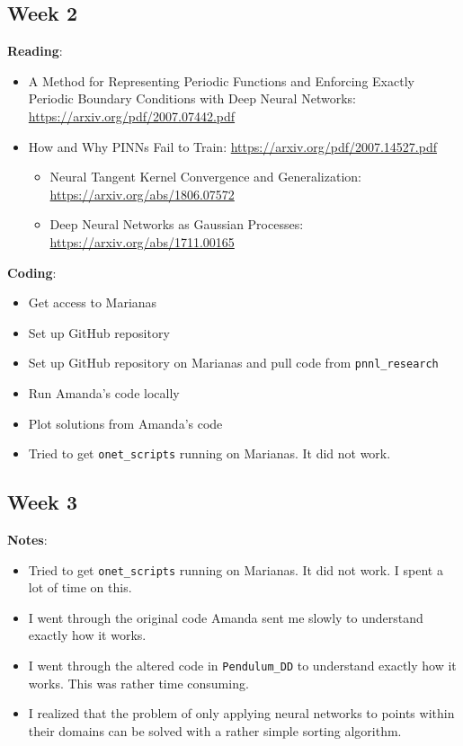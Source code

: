 \documentclass{article}
\def\bf{\textbf}
\begin{document}
\subsection*{Week 2}
\bf{Reading}:
\begin{itemize}
	\item A Method for Representing Periodic Functions and Enforcing Exactly Periodic Boundary Conditions with Deep Neural Networks: \url{https://arxiv.org/pdf/2007.07442.pdf}
	\item How and Why PINNs Fail to Train: \url{https://arxiv.org/pdf/2007.14527.pdf}
	\begin{itemize}
		\item Neural Tangent Kernel Convergence and Generalization: \url{https://arxiv.org/abs/1806.07572}
		\item Deep Neural Networks as Gaussian Processes: \url{https://arxiv.org/abs/1711.00165}
	\end{itemize}
\end{itemize}
\bf{Coding}:
\begin{itemize}
\item Get access to Marianas
\item Set up GitHub repository
\item Set up GitHub repository on Marianas and pull code from \verb|pnnl_research|
\item Run Amanda's code locally
\item Plot solutions from Amanda's code
\item Tried to get \verb|onet_scripts| running on Marianas. It did not work.
\end{itemize}
\subsection*{Week 3} 
\bf{Notes}:
\begin{itemize}
\item Tried to get \verb|onet_scripts| running on Marianas. It did not work. I spent a lot of time on this.
\item I went through the original code Amanda sent me slowly to understand exactly how it works.
\item I went through the altered code in \verb|Pendulum_DD| to understand exactly how it works. This was rather time consuming.
\item I realized that the problem of only applying neural networks to points within their domains can be solved with a rather simple sorting algorithm.
\end{itemize}
\end{document}
